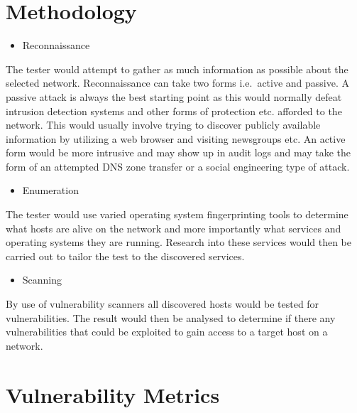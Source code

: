 

  \section{Methodology}\label{sec:methodology-utilized}

    \begin{itemize}
      \item Reconnaissance
    \end{itemize}

    The tester would attempt to gather as much information as possible about
    the selected network. Reconnaissance can take two forms i.e.~active and
    passive. A passive attack is always the best starting point as this
    would normally defeat intrusion detection systems and other forms of
    protection etc. afforded to the network. This would usually involve
    trying to discover publicly available information by utilizing a web
    browser and visiting newsgroups etc. An active form would be more
    intrusive and may show up in audit logs and may take the form of an
    attempted DNS zone transfer or a social engineering type of attack.

    \begin{itemize}
      \item Enumeration
    \end{itemize}

    The tester would use varied operating system fingerprinting tools to
    determine what hosts are alive on the network and more importantly what
    services and operating systems they are running. Research into these
    services would then be carried out to tailor the test to the discovered
    services.

    \begin{itemize}
      \item Scanning
    \end{itemize}

    By use of vulnerability scanners all discovered hosts would be tested
    for vulnerabilities. The result would then be analysed to determine if
    there any vulnerabilities that could be exploited to gain access to a
    target host on a network.

  \section{Vulnerability Metrics}\label{sec:vulnerability-metrics}

